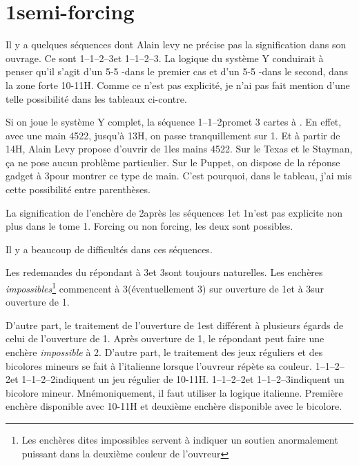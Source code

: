 \documentclass[a4paper,12pt, french, twocolumn]{article}
\newcommand{\T}{\Cl}
\newcommand{\K}{\Di}
\newcommand{\C}{\He}
\renewcommand{\P}{\Sp}
\begin{document}
\section*{1\NT semi-forcing}

Il y a quelques séquences dont Alain levy ne précise pas la signification dans son ouvrage. Ce sont 1\P--1\NT--2\T--3\C et 1\P--1\NT--2\K--3\C. La logique du système Y conduirait à penser qu'il s'agit d'un 5-5 \T-\C dans le premier cas et d'un 5-5 \K-\C dans le second, dans la zone forte 10-11H. Comme ce n'est pas explicité, je n'ai pas fait mention d'une telle possibilité dans les tableaux ci-contre.

Si on joue le système Y complet, la séquence 1\C--1\NT--2\T promet 3 cartes à \T. En effet, avec une main 4522, jusqu'à 13H, on passe tranquillement sur 1\NT.
Et à partir de 14H, Alain Levy propose d'ouvrir de 1\NT les mains 4522. Sur le Texas et le Stayman, ça ne pose aucun problème particulier. Sur le Puppet, on dispose de la réponse gadget à 3\NT pour montrer ce type de main.
C'est pourquoi, dans le tableau, j'ai mis cette possibilité entre parenthèses.


La signification de l'enchère de 2\NT après les séquences 1\C-1\NT et 1\P-1\NT n'est pas explicite non plus dans le tome 1. Forcing ou non forcing, les deux sont possibles.

Il y a beaucoup de difficultés dans ces séquences.

Les redemandes du répondant à 3\T et 3\K sont toujours naturelles. Les enchères \textit{impossibles}\footnote{Les enchères dites impossibles servent à indiquer un soutien anormalement puissant dans la deuxième couleur de l'ouvreur} commencent à 3\P (éventuellement 3\C) sur ouverture de 1\P et à 3\C sur ouverture de 1\C.

D'autre part, le traitement de l'ouverture de 1\C est différent à plusieurs égards de celui de l'ouverture de 1\P. Après ouverture de 1\C, le répondant peut faire une enchère \textit{impossible} à 2\P. D'autre part, le traitement des jeux réguliers et des bicolores mineurs se fait à l'italienne lorsque l'ouvreur répète sa couleur. 1\C--1\NT--2\C--2\P et 1\P--1\NT--2\P--2\NT indiquent un jeu régulier de 10-11H. 1\C--1\NT--2\C--2\NT et 1\P--1\NT--2\P--3\T indiquent un bicolore mineur. Mnémoniquement, il faut utiliser la logique italienne. Première enchère disponible avec 10-11H et deuxième enchère disponible avec le bicolore.
\end{document}
